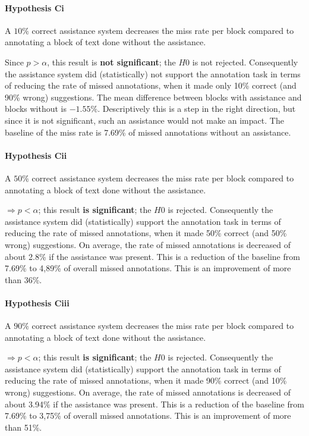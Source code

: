 	\paragraph{Hypothesis Ci}
	\lqq A \(10\%\) correct assistance system decreases the miss rate per block compared to annotating a block of text done without the assistance.\rqq

	Since \(p > \alpha\), this result is \textbf{not significant}; the $H0$ is not rejected.
	Consequently the assistance system did (statistically) not support the annotation task in terms of reducing the rate of missed annotations, when it made only 10\% correct (and 90\% wrong) suggestions. The mean difference between blocks with assistance and blocks without is $-1.55\%$. Descriptively this is a step in the right direction, but since it is not significant, such an assistance would not make an impact. The baseline of the miss rate is 7.69\% of missed annotations without an assistance.

	\paragraph{Hypothesis Cii}
	\lqq A \(50\%\) correct assistance system decreases the miss rate per block compared to annotating a block of text done without the assistance.\rqq

	\(\Rightarrow p < \alpha\); this result \textbf{is significant}; the $H0$ is rejected.
	Consequently the assistance system did (statistically) support the annotation task in terms of reducing the rate of missed annotations, when it made 50\% correct (and 50\% wrong) suggestions. On average, the rate of missed annotations is decreased of about 2.8\% if the assistance was present. This is a reduction of the baseline from 7.69\% to 4,89\% of overall missed annotations. This is an improvement of more than 36\%.

	\paragraph{Hypothesis Ciii}
	\lqq A \(90\%\) correct assistance system decreases the miss rate per block compared to annotating a block of text done without the assistance.\rqq

	\(\Rightarrow p < \alpha\); this result \textbf{is significant}; the $H0$ is rejected.
	Consequently the assistance system did (statistically) support the annotation task in terms of reducing the rate of missed annotations, when it made 90\% correct (and 10\% wrong) suggestions. On average, the rate of missed annotations is decreased of about 3.94\% if the assistance was present. This is a reduction of the baseline from 7.69\% to 3,75\% of overall missed annotations. This is an improvement of more than 51\%.



